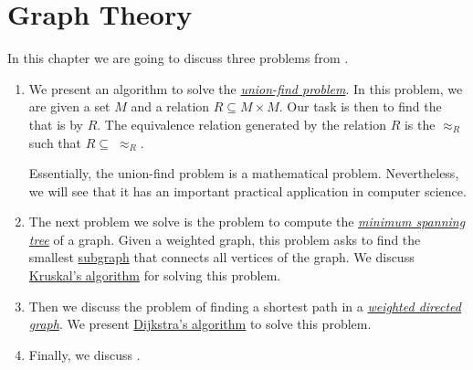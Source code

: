 \chapter{Graph Theory}
In this chapter we are going to discuss three problems from .
\begin{enumerate}
\item We present an algorithm to solve the 
      \href{https://en.wikipedia.org/wiki/Disjoint-set_data_structure}{\emph{union-find problem}}.
      In this problem, we are given a set $M$ and a relation $R \subseteq M \times M$.  Our task is
      then to find the  that is  by $R$.  The equivalence relation
      generated by the relation $R$ is the  $\approx_R$ such that $R \subseteq\; \approx_R$.
      
      Essentially, the union-find problem is a mathematical problem.  Nevertheless, we will see that 
      it has an important practical application in computer science. 
\item The next problem we solve is the problem to compute the
      \href{https://en.wikipedia.org/wiki/Minimum_spanning_tree}{\emph{minimum spanning tree}}
      of a graph.  Given a weighted graph, this problem asks to find the smallest 
      \href{https://en.wikipedia.org/wiki/Glossary_of_graph_theory_terms#subgraph}{subgraph} that 
      connects all vertices of the graph.  We discuss
      \href{https://en.wikipedia.org/wiki/Kruskal%27s_algorithm}{Kruskal's algorithm} 
      for solving this problem.  
\item Then we discuss the problem of finding a shortest path in a 
      \href{https://en.wikipedia.org/wiki/Directed_graph}{\emph{weighted directed graph}}.
      We present \href{https://en.wikipedia.org/wiki/Dijkstra%27s_algorithm}{Dijkstra's algorithm} to solve
      this problem.   
\item Finally, we discuss .
\end{enumerate}

